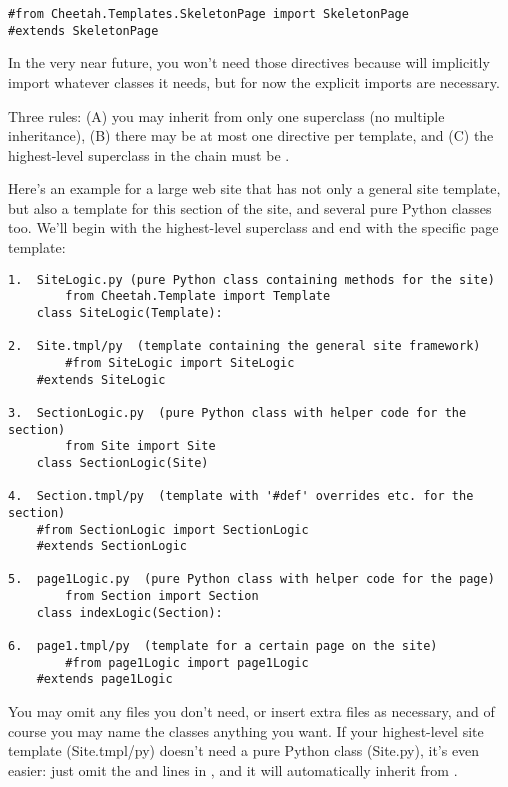 \begin{verbatim}
#from Cheetah.Templates.SkeletonPage import SkeletonPage
#extends SkeletonPage
\end{verbatim}

In the very near future, you won't need those 
directives because  will implicitly import whatever 
classes it needs, but for now the explicit imports are necessary.

Three rules: (A) you may inherit from only one superclass (no multiple
inheritance), (B) there may be at most one  directive per
template, and (C) the highest-level superclass in the chain must be
.  

Here's an example for a large web site that has not only a general site
template, but also a template for this section of the site, and several pure
Python classes too.  We'll begin with the highest-level superclass and
end with the specific page template:

\begin{verbatim}
1.  SiteLogic.py (pure Python class containing methods for the site)
        from Cheetah.Template import Template
	class SiteLogic(Template):

2.  Site.tmpl/py  (template containing the general site framework)
        #from SiteLogic import SiteLogic
	#extends SiteLogic

3.  SectionLogic.py  (pure Python class with helper code for the section)
        from Site import Site
	class SectionLogic(Site)

4.  Section.tmpl/py  (template with '#def' overrides etc. for the section)
	#from SectionLogic import SectionLogic
	#extends SectionLogic

5.  page1Logic.py  (pure Python class with helper code for the page)
        from Section import Section
	class indexLogic(Section):

6.  page1.tmpl/py  (template for a certain page on the site)
        #from page1Logic import page1Logic
	#extends page1Logic
\end{verbatim}

You may omit any files you don't need, or insert extra files as necessary, and
of course you may name the classes anything you want.  If your highest-level
site template (Site.tmpl/py) doesn't need a pure Python class (Site.py), it's
even easier: just omit the  and  lines
in , and it will automatically inherit from .

